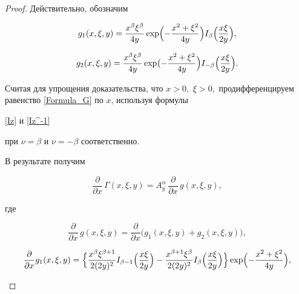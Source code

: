 \begin{proof}

Действительно, обозначим 

$$

g_1(x,\xi,y)=\frac{ x^{\beta} \xi^{\beta}}{4y}\exp\Bigl({-\frac{x^2+\xi^2}{4y}}\Bigr)

I_{\beta}\Bigl(\frac{x\xi}{2y} \Bigr),

$$

$$

g_2(x,\xi,y)=\frac{ x^{\beta} \xi^{\beta}}{4y} \exp \bigl({-\frac{x^2+\xi^2}{4y}}\Bigr)

I_{-\beta}\Bigl(\frac{x\xi}{2y} \Bigr).

$$

Считая для упрощения доказательства, что $x>0,$ $\xi>0,$  продифференцируем равенство \eqref{Formula_G} по $x$, используя формулы 

\eqref{Iz} и \eqref{Iz^-1}

при $\nu=\beta$ и $\nu=-\beta$ соответственно.

В результате получим

\begin{equation}\label{GammaPartial_x}

\frac{\partial}{\partial x}\,\Gamma(x,\xi,y)=A^{\alpha}_{y}\,\frac{\partial}{\partial x}\,g(x,\xi,y),

\end{equation}

где 

$$

\frac{\partial}{\partial x}\,g(x,\xi,y)=

\frac{\partial}{\partial x}\bigl(g_1(x,\xi,y)+g_2(x,\xi,y)\bigr),

$$

\begin{equation}\label{g_1Partial_x}

\frac{\partial}{\partial x} g_1(x,\xi,y)=

\Bigl\{

\frac{x^{\beta}\xi^{\beta+1}}{2 (2y)^2} I_{\beta-1}\Bigl(\frac{x\xi}{2y}\Bigr)-

\frac{x^{\beta+1}\xi^{\beta}}{2 (2y)^2} I_{\beta}\Bigl(\frac{x\xi}{2y}\Bigr)\Bigr\}

\exp\Bigl({-\frac{x^2+\xi^2}{4y}}\Bigr),

\end{equation}

\begin{equation}\label{g_2Partial_x}


\end{equation}
\end{proof}
